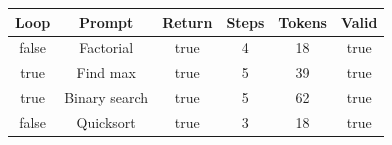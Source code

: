 \begin{table}[h]
\centering
\begin{tabular}{ |c|c|c|c|c|c| }
\hline
Loop & Prompt & Return & Steps & Tokens & Valid \\
\hline
false & Factorial & true & 4 & 18 & true \\
\hline
true & Find max & true & 5 & 39 & true \\
\hline
true & Binary search & true & 5 & 62 & true \\
\hline
false & Quicksort & true & 3 & 18 & true \\
\hline
\end{tabular}
\end{table}
